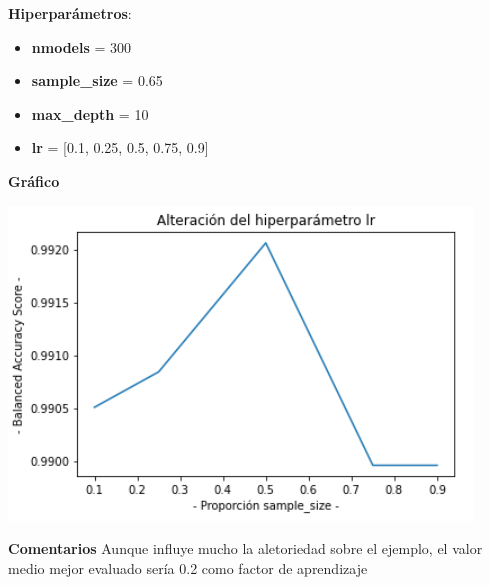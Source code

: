 \documentclass[conference,a4paper]{IEEEtran}
\begin{document}
\begin{textb}
    \textbf{Hiperparámetros}:
  \begin{itemize}
      \item \textbf{nmodels} = 300
      \item \textbf{sample\_size} = 0.65
      \item \textbf{max\_depth} = 10
      \item \textbf{lr} = [0.1, 0.25, 0.5, 0.75, 0.9]
  \end{itemize}
  \textbf{Gráfico}
  
  \begin{center}
    \includegraphics[scale=0.80]{figures/lr_titanic_trees.png}
    \label{fig:funcion_clasificacion}
  \end{center}
  
  \textbf{Comentarios} Aunque influye mucho la aletoriedad sobre el ejemplo, el valor medio mejor evaluado sería 0.2 como factor de aprendizaje
\end{textb}
\end{document}
